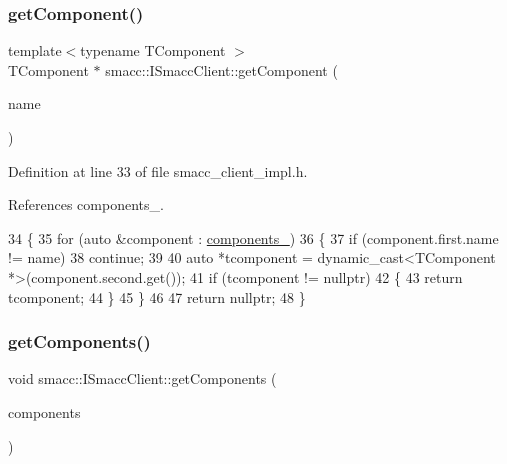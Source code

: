 \subsubsection{\texorpdfstring{get\+Component()}{getComponent()}\hspace{0.1cm}{\footnotesize\ttfamily [2/2]}}
{\footnotesize\ttfamily template$<$typename T\+Component $>$ \\
T\+Component $\ast$ smacc\+::\+I\+Smacc\+Client\+::get\+Component (\begin{DoxyParamCaption}\item[{std\+::string}]{name }\end{DoxyParamCaption})}



Definition at line 33 of file smacc\+\_\+client\+\_\+impl.\+h.



References components\+\_\+.


\begin{DoxyCode}
34     \{
35         \textcolor{keywordflow}{for} (\textcolor{keyword}{auto} &component : \hyperlink{classsmacc_1_1ISmaccClient_a9e670e9071bb549dbeb08985d0114afe}{components\_})
36         \{
37             \textcolor{keywordflow}{if} (component.first.name != name)
38                 \textcolor{keywordflow}{continue};
39 
40             \textcolor{keyword}{auto} *tcomponent = \textcolor{keyword}{dynamic\_cast<}TComponent *\textcolor{keyword}{>}(component.second.get());
41             \textcolor{keywordflow}{if} (tcomponent != \textcolor{keyword}{nullptr})
42             \{
43                 \textcolor{keywordflow}{return} tcomponent;
44             \}
45         \}
46 
47         \textcolor{keywordflow}{return} \textcolor{keyword}{nullptr};
48     \}
\end{DoxyCode}
\mbox{\label{classsmacc_1_1ISmaccClient_ac6db21c1ec7072178e9f7c721908e07d}} 
\subsubsection{\texorpdfstring{get\+Components()}{getComponents()}}
{\footnotesize\ttfamily void smacc\+::\+I\+Smacc\+Client\+::get\+Components (\begin{DoxyParamCaption}\item[{std\+::vector$<$ std\+::shared\+\_\+ptr$<$ \hyperlink{classsmacc_1_1ISmaccComponent}{I\+Smacc\+Component} $>$$>$ \&}]{components }\end{DoxyParamCaption})}



